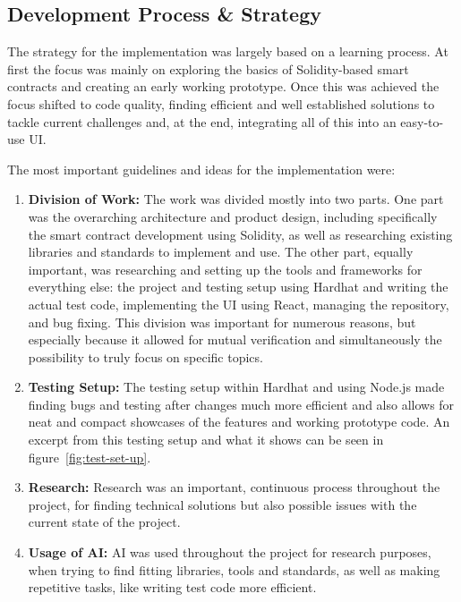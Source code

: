 \documentclass[11pt,a4paper]{article}
\begin{document}
		\subsection{Development Process \& Strategy}\label{subsec:dev-strategy}
		The strategy for the implementation was largely based on a learning process.
		At first the focus was mainly on exploring the basics of Solidity-based smart contracts and creating an early working prototype.
		Once this was achieved the focus shifted to code quality, finding efficient and well established solutions to tackle current challenges and, at the end, integrating all of this into an easy-to-use UI.

		The most important guidelines and ideas for the implementation were:

		\begin{enumerate}[1]
			\item \textbf{Division of Work:} The work was divided mostly into two parts.
				One part was the overarching architecture and product design, including specifically the smart contract development using Solidity, as well as researching existing libraries and standards to implement and use.
				The other part, equally important, was researching and setting up the tools and frameworks for everything else: the project and testing setup using Hardhat and writing the actual test code, implementing the UI using React, managing the repository, and bug fixing.
				This division was important for numerous reasons, but especially because it allowed for mutual verification and simultaneously the possibility to truly focus on specific topics.
			\item \textbf{Testing Setup:} The testing setup within Hardhat and using Node.js made finding bugs and testing after changes much more efficient and also allows for neat and compact showcases of the features and working prototype code.
				An excerpt from this testing setup and what it shows can be seen in figure~\ref{fig:test-set-up}.
			\item \textbf{Research:} Research was an important, continuous process throughout the project, for finding technical solutions but also possible issues with the current state of the project.
			\item \textbf{Usage of AI:} AI was used throughout the project for research purposes, when trying to find fitting libraries, tools and standards, as well as making repetitive tasks, like writing test code more efficient.
		\end{enumerate}
\end{document}
